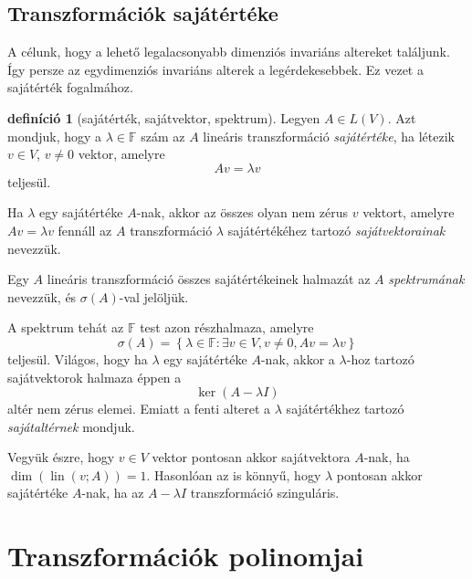 \documentclass[9pt, a4paper, showtrims]{memoir}
\theoremstyle{plain}
\theoremstyle{remark}
\theoremstyle{definition}
\newtheorem{definition}[proposition]{definíció}
\DeclareMathOperator{\lin}{lin}
\begin{document}
\section{Transzformációk sajátértéke}
A célunk, hogy a lehető legalacsonyabb dimenziós invariáns altereket találjunk.
Így persze az egydimenziós invariáns alterek a legérdekesebbek.
Ez vezet a sajátérték fogalmához.
\begin{definition}[sajátérték, sajátvektor, spektrum]
	Legyen $A\in L\left( V \right)$.
	Azt mondjuk, hogy a $\lambda\in\mathbb{F}$ szám az $A$ lineáris transzformáció
	\emph{sajátértéke},
	ha létezik $v\in V$, $v\neq 0$ vektor, amelyre
	\[
		Av=\lambda v
	\]
	teljesül.

	Ha $\lambda$ egy sajátértéke $A$-nak,
	akkor az összes olyan nem zérus $v$ vektort,
	amelyre $Av=\lambda v$ fennáll az $A$ transzformáció $\lambda$ sajátértékéhez tartozó
	\emph{sajátvektorainak} nevezzük.

	Egy $A$ lineáris transzformáció összes sajátértékeinek halmazát az
	$A$ \emph{spektrumának} nevezzük, és
	$\sigma\left( A \right)$-val jelöljük.
\end{definition}
A spektrum tehát az $\mathbb{F}$ test azon részhalmaza, amelyre
\[
	\sigma\left( A \right)
	=
	\left\{
	\lambda\in\mathbb{F}:\exists v\in V, v\neq 0, Av=\lambda v
	\right\}
\]
teljesül.
Világos, hogy ha $\lambda$ egy sajátértéke $A$-nak, akkor a $\lambda$-hoz tartozó
sajátvektorok halmaza éppen a
\[
	\ker\left( A-\lambda I \right)
\]
altér nem zérus elemei.
Emiatt a fenti alteret a $\lambda$ sajátértékhez tartozó \emph{sajátaltérnek}
mondjuk.

Vegyük észre,
hogy $v\in V$ vektor pontosan akkor sajátvektora $A$-nak, ha $\dim\left( \lin\left( v;A \right) \right)=1$.
Hasonlóan az is könnyű, hogy $\lambda$ pontosan akkor sajátértéke $A$-nak,
ha az $A-\lambda I$ transzformáció szinguláris.

\chapter{Transzformációk polinomjai}
\end{document}
